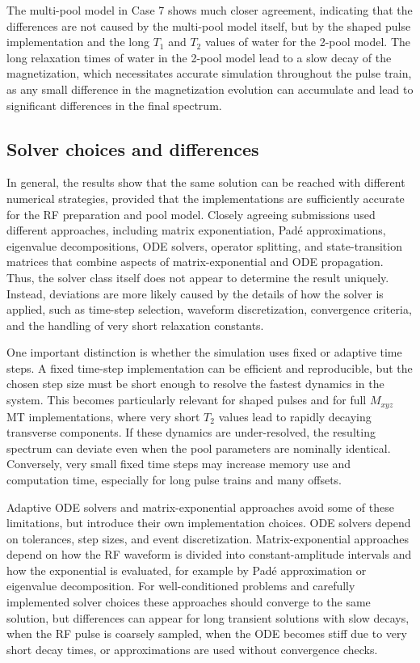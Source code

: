 \documentclass[11pt,a4paper]{article}
\begin{document}
The multi-pool model in Case 7 shows much closer agreement, indicating that the differences are not caused by the multi-pool model itself, but by the shaped pulse implementation and the long $T_1$ and $T_2$ values of water for the 2-pool model.
The long relaxation times of water in the 2-pool model lead to a slow decay of the magnetization, which necessitates accurate simulation throughout the pulse train, as any small difference in the magnetization evolution can accumulate and lead to significant differences in the final spectrum.


\subsection{Solver choices and differences}
In general, the results show that the same solution can be reached with different numerical strategies, provided that the implementations are sufficiently accurate for the RF preparation and pool model. Closely agreeing submissions used different approaches, including matrix exponentiation, Pad\'e approximations, eigenvalue decompositions, ODE solvers, operator splitting, and state-transition matrices that combine aspects of matrix-exponential and ODE propagation. Thus, the solver class itself does not appear to determine the result uniquely. Instead, deviations are more likely caused by the details of how the solver is applied, such as time-step selection, waveform discretization, convergence criteria, and the handling of very short relaxation constants.

One important distinction is whether the simulation uses fixed or adaptive time steps. A fixed time-step implementation can be efficient and reproducible, but the chosen step size must be short enough to resolve the fastest dynamics in the system. This becomes particularly relevant for shaped pulses and for full $M_{xyz}$ MT implementations, where very short $T_2$ values lead to rapidly decaying transverse components. If these dynamics are under-resolved, the resulting spectrum can deviate even when the pool parameters are nominally identical. Conversely, very small fixed time steps may increase memory use and computation time, especially for long pulse trains and many offsets.

Adaptive ODE solvers and matrix-exponential approaches avoid some of these limitations, but introduce their own implementation choices. ODE solvers depend on tolerances, step sizes, and event discretization. Matrix-exponential approaches depend on how the RF waveform is divided into constant-amplitude intervals and how the exponential is evaluated, for example by Pad\'e approximation or eigenvalue decomposition. For well-conditioned problems and carefully implemented solver choices these approaches should converge to the same solution, but differences can appear for long transient solutions with slow decays, when the RF pulse is coarsely sampled, when the ODE becomes stiff due to very short decay times, or approximations are used without convergence checks.
\end{document}
